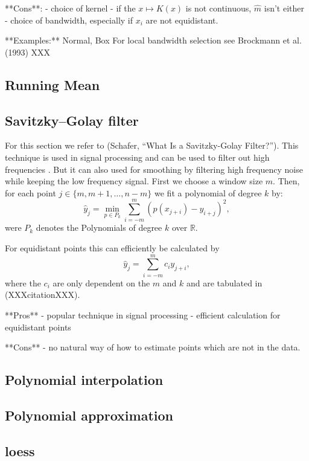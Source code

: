 **Cons**:
- choice of kernel
- if the $x \mapsto K(x)$ is not continuous, $\hat m $ isn't either
- choice of bandwidth, especially if $x_i$ are not equidistant.

**Examples:**
Normal, Box
For local bandwidth selection see Brockmann et al. (1993) XXX

\subsection{Running Mean}
\label{sec:Running}


\subsection{Savitzky–Golay filter}
\label{sec:Savitzky–Golay}
For this section we refer to (Schafer, “What Is a Savitzky-Golay Filter?”). This technique is used in signal processing and can be used to filter out high frequencies . But it can also used for smoothing by filtering high frequency noise while keeping the low frequency signal.
First we choose a window size $m$. Then, for each point $j \in \{m, m+1, \dots, n-m\}$ we fit a polynomial of degree $k$ by:
$$\hat y_j=\min_{p\in P_k}\sum_{i=-m}^{m}(p (x_{j+i})-y_{i+j})^{2},$$
were $P_k$ denotes the Polynomials of degree $k$ over $\mathbb R$.

For equidistant points this can efficiently be calculated by
$$
    \hat y_{j}=\sum_{i=-m}^{m} c_{i} y_{j+i},
$$
where the $c_i$ are only dependent on the $m$ and $k$ and are tabulated in (XXXcitationXXX).

**Pros**
- popular technique in signal processing
- efficient calculation for equidistant points

**Cons**
- no natural way of how to estimate points which are not in the data.

\subsection{Polynomial interpolation }
\label{sec:Polynomial}

\subsection{Polynomial approximation}
\label{sec:Polynomial}

\subsection{loess}
\label{sec:loess}

